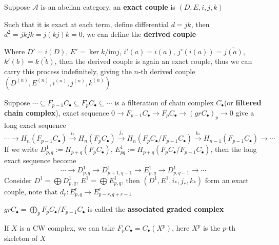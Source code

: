 \documentclass[main]{subfiles}
\begin{document}
\begin{definition}
Suppose $\mathscr A$ is an abelian category, an \textbf{exact couple} is $(D,E,i,j,k)$
\begin{center}
\end{center}
Such that it is exact at each term, define differential $d=jk$, then $d^2=jkjk=j(kj)k=0$, we can define the \textbf{derived couple}
\begin{center}
\end{center}
Where $D'=i(D)$, $E'=\ker k/\mathrm{im}j$, $i'(a)=i(a)$, $j'(i(a))=\overline{j(a)}$, $k'(b)=\overline{k(b)}$, then the derived couple is again an exact couple, thus we can carry this process indefinitely, giving the $n$-th derived couple $(D^{(n)},E^{(n)},i^{(n)},j^{(n)},k^{(n)})$
\end{definition}

\begin{example}
Suppose $\cdots\subseteq F_{p-1}C_\bullet\subseteq F_{p}C_\bullet\subseteq\cdots$ is a filteration of chain complex $C_\bullet$(or \textbf{filtered chain complex}), exact sequence $0\to F_{p-1}C_\bullet\to F_{p}C_\bullet\to (grC_\bullet)_p\to0$ give a long exact sequence
\[\cdots\to H_n(F_{p-1}C_\bullet)\xrightarrow{i_*} H_n(F_{p}C_\bullet)\xrightarrow{j_*} H_n(F_{p}C_\bullet/ F_{p-1}C_\bullet)\xrightarrow{k_*} H_{n-1}(F_{p-1}C_\bullet)\to\cdots\]
If we write $D^1_{p,q}:=H_{p+q}(F_pC_\bullet)$, $E^1_{pq}:=H_{p+q}(F_{p}C_\bullet/ F_{p-1}C_\bullet)$, then the long exact sequence become
\[\cdots\to D^1_{p,q}\to D^1_{p+1,q-1}\to E^1_{p,q}\to D^1_{p,q-1}\to\cdots\]
Consider $D^1=\bigoplus D^1_{p,q}$, $E^1=\bigoplus E^1_{p,q}$, then $(D^1,E^1,i_*,j_*,k_*)$ form an exact couple, note that $d_r:E^r_{p,q}\to E^r_{p-r,q+r-1}$
\end{example}

\begin{remark}
$grC_\bullet=\bigoplus_{p}F_{p}C_\bullet/ F_{p-1}C_\bullet$ is called the \textbf{associated graded complex} \par
If $X$ is a CW complex, we can take $F_pC_\bullet=C_\bullet(X^{p})$, here $X^p$ is the $p$-th skeleton of $X$
\end{remark}
\end{document}
